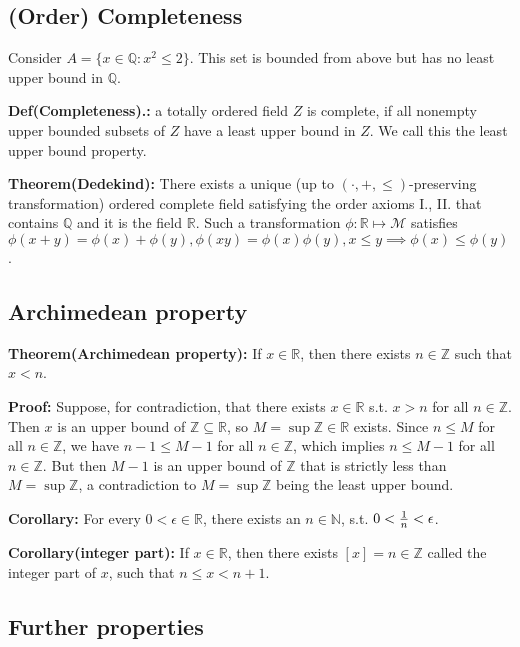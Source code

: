 \documentclass{article}
\begin{document}
\subsection{(Order) Completeness}

Consider $A=\{x\in \mathbb{Q}:x^2\leq 2\}$. This set is bounded from above but has no least upper bound in $\mathbb{Q}$.

\textbf{Def(Completeness).:} a totally ordered field $Z$ is complete, if all nonempty upper bounded subsets of $Z$ have a least upper bound in $Z$. We call this the least upper bound property.

\textbf{Theorem(Dedekind):} There exists a unique (up to $(\cdot, +,\leq)$-preserving transformation) ordered complete field satisfying the order axioms I., II. that contains $\mathbb{Q}$ and it is the field $\mathbb{R}$.
Such a transformation $\phi:\mathbb{R}\mapsto \mathcal{M}$ satisfies $\phi(x+y)=\phi(x)+\phi(y), \phi(xy)=\phi(x)\phi(y), x\leq y \implies \phi(x)\leq \phi(y)$.


\subsection{Archimedean property}

\textbf{Theorem(Archimedean property):} If $x\in \mathbb{R}$, then there exists $n\in \mathbb{Z}$ such that $x<n$.

\textbf{Proof:} Suppose, for contradiction, that there exists $x\in \mathbb{R}$ s.t. $x>n$ for all $n\in \mathbb{Z}$. Then $x$ is an upper bound of $\mathbb{Z\subseteq\mathbb{R}}$, so $M=\sup\mathbb{Z}\in\mathbb{R}$ exists. Since $n\leq M$ for all $n\in \mathbb{Z}$, we have $n-1\leq M-1$ for all $n\in \mathbb{Z}$, which implies $n\leq M-1$ for all $n\in \mathbb{Z}$. But then $M-1$ is an upper bound of $\mathbb{Z}$ that is strictly less than $M=\sup \mathbb{Z}$, a contradiction to $M=\sup \mathbb{Z}$ being the least upper bound.

\textbf{Corollary:} For every $0<\epsilon\in \mathbb{R}$, there exists an $n\in \mathbb{N}$, s.t. $0<{1\over n}<\epsilon$.

\textbf{Corollary(integer part):} If $x\in \mathbb{R}$, then there exists $[x]=n\in \mathbb{Z}$ called the integer part of $x$, such that $n\leq x<n+1$.


\subsection{Further properties}
\end{document}
